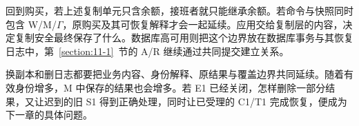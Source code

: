 
回到购买，若上述复制单元只含余额，接班者就只能继承余额。若命令与快照同时包含 W/M/$\Gamma$，原购买及其可恢复解释才会一起延续。应用交给复制层的内容，决定复制安全最终保存了什么。数据库高可用则把这个边界放在数据库事务与其恢复日志中，第~\ref{section:11-1}~节的 A/R 继续通过共同提交建立关系。

换副本和删日志都要把业务内容、身份解释、原结果与覆盖边界共同延续。随着有效身份增多，M 中保存的结果也会增多。若 E1 已经关闭，怎样删除一部分结果，又让迟到的旧 S1 得到正确处理，同时让已受理的 C1/T1 完成恢复，便成为下一章的具体问题。
\FloatBarrier
